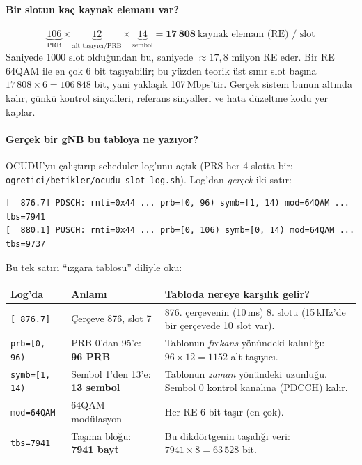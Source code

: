 \paragraph{Bir slotun kaç kaynak elemanı var?}
\begin{equation*}
\underbrace{106}_{\text{PRB}}\times\underbrace{12}_{\text{alt taşıyıcı/PRB}}\times\underbrace{14}_{\text{sembol}}=\mathbf{17\,808}\ \text{kaynak elemanı (RE) / slot}
\end{equation*}
Saniyede 1000 slot olduğundan bu, saniyede $\approx 17{,}8$ milyon RE eder. Bir RE 64QAM ile en çok 6 bit taşıyabilir; bu yüzden teorik üst sınır slot başına $17\,808\times 6=106\,848$ bit,
yani yaklaşık 107\,Mbps'tir. Gerçek sistem bunun altında kalır, çünkü kontrol sinyalleri, referans sinyalleri ve hata düzeltme kodu yer kaplar.

\paragraph{Gerçek bir gNB bu tabloya ne yazıyor?}
OCUDU'yu çalıştırıp scheduler log'unu açtık (PRS her 4 slotta bir; \texttt{ogretici/betikler/ocudu\_slot\_log.sh}). Log'dan \emph{gerçek} iki satır:

\begin{lstlisting}
[  876.7] PDSCH: rnti=0x44 ... prb=[0, 96) symb=[1, 14) mod=64QAM ... tbs=7941
[  880.1] PUSCH: rnti=0x44 ... prb=[0, 106) symb=[0, 14) mod=64QAM ... tbs=9737
\end{lstlisting}

Bu tek satırı ``ızgara tablosu'' diliyle oku:
\begin{center}
\sffamily\small
\begin{tabularx}{\textwidth}{@{}p{3.3cm}p{4.6cm}X@{}}
\toprule
\textbf{Log'da} & \textbf{Anlamı} & \textbf{Tabloda nereye karşılık gelir?} \\
\midrule
\texttt{[ 876.7]} & Çerçeve 876, slot 7 & 876. çerçevenin (10\,ms) 8. slotu (15\,kHz'de bir çerçevede 10 slot var). \\
\texttt{prb=[0, 96)} & PRB 0'dan 95'e: \textbf{96 PRB} & Tablonun \emph{frekans} yönündeki kalınlığı: $96\times12=1152$ alt taşıyıcı. \\
\texttt{symb=[1, 14)} & Sembol 1'den 13'e: \textbf{13 sembol} & Tablonun \emph{zaman} yönündeki uzunluğu. Sembol 0 kontrol kanalına (PDCCH) kalır. \\
\texttt{mod=64QAM} & 64QAM modülasyon & Her RE 6 bit taşır (en çok). \\
\texttt{tbs=7941} & Taşıma bloğu: \textbf{7941 bayt} & Bu dikdörtgenin taşıdığı veri: $7941\times8=63\,528$ bit. \\
\bottomrule
\end{tabularx}
\end{center}

